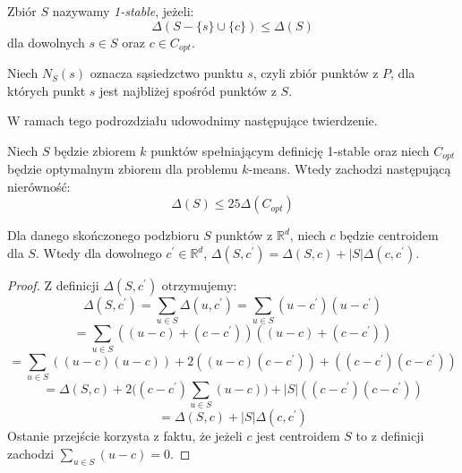 \begin{definition}
    Zbiór $S$ nazywamy \emph{1-stable}, jeżeli:
    \begin{equation}
        \Delta(S - \{s\} \cup \{c\}) \leq \Delta(S)
    \end{equation}
    dla dowolnych $s \in S$ oraz $c \in C_{opt}$.
\end{definition}

\begin{definition}
    Niech $N_{S}(s)$ oznacza sąsiedzctwo punktu $s$, czyli zbiór punktów z $P$, dla których punkt $s$ jest najbliżej spośród punktów z $S$.
\end{definition}

\noindent
W ramach tego podrozdziału udowodnimy następujące twierdzenie.

\begin{thm}{\cite{10.1145/1007352.1007400}}
    Niech $S$ będzie zbiorem $k$ punktów spełniającym definicję 1-stable oraz niech $C_{opt}$ będzie optymalnym zbiorem dla problemu $k$-means.
    Wtedy zachodzi następującą nierówność:
    \begin{equation}
        \Delta(S) \leq 25 \Delta(C_{opt})
    \end{equation} 
\end{thm}

\begin{lemma}{\cite{10.1145/1007352.1007400}}
    Dla danego skończonego podzbioru $S$ punktów z $\mathbb{R}^d$, niech $c$ będzie centroidem dla $S$. Wtedy dla dowolnego $c^{'} \in \mathbb{R}^d$, $\Delta(S, c^{'}) = \Delta(S, c) + |S|\Delta(c, c^{'})$.
\end{lemma}
\begin{proof}
    Z definicji $\Delta(S, c^{'})$ otrzymujemy:
    \begin{equation}
        \Delta(S, c^{'}) = \sum_{u \in S} \Delta(u, c^{'}) =  \sum_{u \in S} (u - c^{'}) (u - c^{'})
    \end{equation}
    \begin{equation}
         = \sum_{u \in S} ((u - c) + (c - c^{'})) ((u - c) + (c - c^{'}))
    \end{equation}
    \begin{equation}
        = \sum_{u \in S} ((u - c)(u - c)) + 2((u - c)(c - c^{'})) + ((c - c^{'})(c - c^{'}))
    \end{equation}
    \begin{equation}
        = \Delta(S, c) + 2\Big( (c - c^{'}) \sum_{u \in S} (u - c) \Big) + |S|((c - c^{'})(c - c^{'}))
    \end{equation}
    \begin{equation}
        = \Delta(S, c) + |S|\Delta(c,c^{'})
    \end{equation}
    Ostanie przejście korzysta z faktu, że jeżeli $c$ jest centroidem $S$ to z definicji zachodzi $\sum_{u \in S} (u - c) = 0$.
\end{proof}

